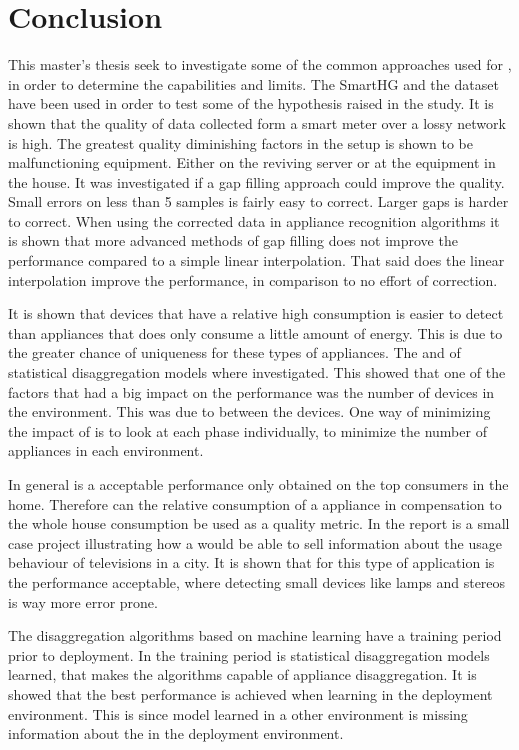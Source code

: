 \chapter{Conclusion}
This master's thesis seek to investigate some of the common approaches used for , in order to determine the capabilities and limits. The SmartHG and the  dataset have been used in order to test some of the hypothesis raised in the study. It is shown that the quality of data collected form a smart meter over a lossy network is high. The greatest quality diminishing factors in the setup is shown to be malfunctioning equipment. Either on the reviving server or at the equipment in the house. It was investigated if a gap filling approach could improve the quality. Small errors on less than 5 samples is fairly easy to correct. Larger gaps is harder to correct. When using the corrected data in appliance recognition algorithms it is shown that more advanced methods of gap filling does not improve the performance compared to a simple linear interpolation. That said does the linear interpolation improve the performance, in comparison to no effort of correction. 

It is shown that devices that have a relative high consumption is easier to detect than appliances that does only consume a little amount of energy. This is due to the greater chance of uniqueness for these types of appliances. The  and  of statistical disaggregation models where investigated. This showed that one of the factors that had a big impact on the performance was the number of devices in the environment. This was due to  between the devices. One way of minimizing the impact of  is to look at each phase individually, to minimize the number of appliances in each environment. 

In general is a acceptable performance only obtained on the top consumers in the home. Therefore can the relative consumption of a appliance in compensation to the whole house consumption be used as a quality metric. In the report is a small case project illustrating how a  would be able to sell information about the usage behaviour of televisions in a city. It is shown that for this type of application is the performance acceptable, where detecting small devices like lamps and stereos is way more error prone. 

The  disaggregation algorithms based on machine learning have a training period prior to deployment. In the training period is statistical disaggregation models learned, that makes the algorithms capable of appliance disaggregation. It is showed that the best performance is achieved when learning in the deployment environment. This is since model learned in a other environment is missing information about the  in the deployment environment. 

